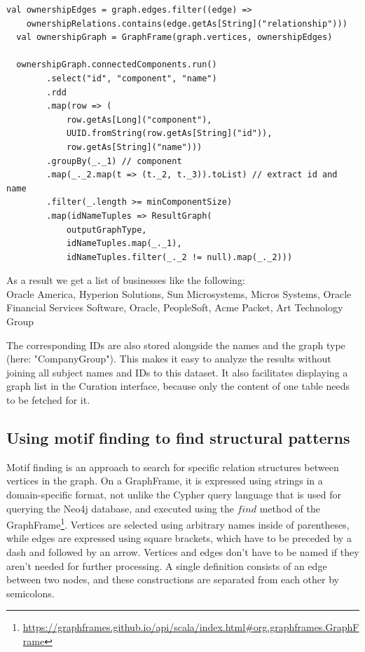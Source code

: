 \documentclass[
        a4paper,     %
        titlepage,   %
        oneside,     %
        parskip      %
]{scrartcl}          %
\begin{document}
  \begin{lstlisting}[style=scalaStyle,caption=Company Group Extraction]
  val ownershipEdges = graph.edges.filter((edge) =>
    ownershipRelations.contains(edge.getAs[String]("relationship")))
  val ownershipGraph = GraphFrame(graph.vertices, ownershipEdges)

  ownershipGraph.connectedComponents.run()
		.select("id", "component", "name")
		.rdd
		.map(row => (
			row.getAs[Long]("component"),
			UUID.fromString(row.getAs[String]("id")),
			row.getAs[String]("name")))
		.groupBy(_._1) // component
		.map(_._2.map(t => (t._2, t._3)).toList) // extract id and name
		.filter(_.length >= minComponentSize)
		.map(idNameTuples => ResultGraph(
			outputGraphType,
			idNameTuples.map(_._1),
			idNameTuples.filter(_._2 != null).map(_._2)))
  \end{lstlisting}

  As a result we get a list of businesses like the following:\\
  Oracle America, Hyperion Solutions, Sun Microsystems, Micros Systems, Oracle Financial Services Software, Oracle, PeopleSoft, Acme Packet, Art Technology Group

  The corresponding IDs are also stored alongside the names and the graph type (here: "CompanyGroup"). This makes it easy to analyze
  the results without joining all subject names and IDs to this dataset. It also facilitates displaying
  a graph list in the Curation interface, because only the content of one table needs to be fetched for it.

  \subsection{Using motif finding to find structural patterns}
  Motif finding is an approach to search for specific relation structures between
  vertices in the graph. On a GraphFrame, it is expressed using strings in a
  domain-specific format, not unlike the Cypher query language that is used for
  querying the Neo4j database, and executed using the $find$ method of the
  GraphFrame\footnote{\url{https://graphframes.github.io/api/scala/index.html\#org.graphframes.GraphFrame}}.
  Vertices are selected using arbitrary names inside of parentheses, while edges are
  expressed using square brackets, which have to be preceded by a dash and followed by
  an arrow. Vertices and edges don't have to be named if they aren't needed for further processing.
  A single definition consists of an edge between two nodes, and these constructions are
  separated from each other by semicolons.
\end{document}
